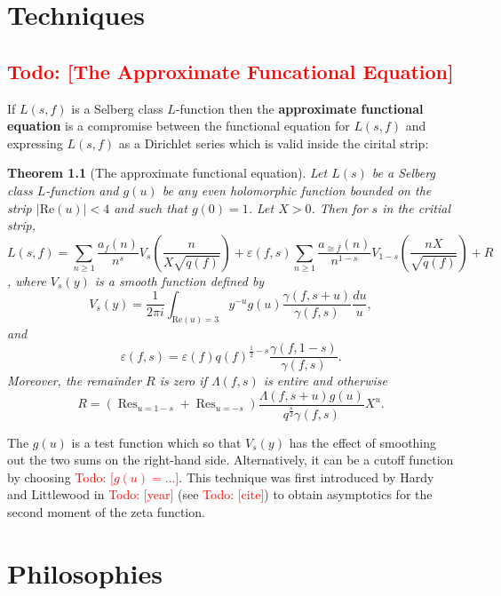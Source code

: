 \documentclass[12pt]{book}
\newtheorem{theorem}{Theorem}[section]
\theoremstyle{definition}\newframedtheorem{method}{Method}
\newcommand{\g}{\gamma}
\renewcommand{\L}{\Lambda}
\newcommand{\e}{\varepsilon}
\newcommand{\<}{\langle}
\renewcommand{\>}{\rangle}
\DeclareMathOperator*{\Res}{\mathrm{Res}}
\renewcommand{\Re}{\mathrm{Re}}
\newcommand{\todo}[1]{\textcolor{red}{\sf Todo: [#1]}}
\begin{document}
\chapter{Techniques}
  \section{\todo{The Approximate Funcational Equation}}
    If $L(s,f)$ is a Selberg class $L$-function then the \textbf{approximate functional equation} is a compromise between the functional equation for $L(s,f)$ and expressing $L(s,f)$ as a Dirichlet series which is valid inside the cirital strip:

    \begin{theorem}[The approximate functional equation]
      Let $L(s)$ be a Selberg class $L$-function and $g(u)$ be any even holomorphic function bounded on the strip $|\Re(u)| < 4$ and such that $g(0) = 1$. Let $X > 0$. Then for $s$ in the critial strip,
      \[
        L(s,f) = \sum_{n \ge 1}\frac{a_{f}(n)}{n^{s}}V_{s}\left(\frac{n}{X\sqrt{q(f)}}\right)+\e(f,s)\sum_{n \ge 1}\frac{a_{\cong{f}}(n)}{n^{1-s}}V_{1-s}\left(\frac{nX}{\sqrt{q(f)}}\right)+R
      \],
      where $V_{s}(y)$ is a smooth function defined by
      \[
        V_{s}(y) = \frac{1}{2\pi i}\int_{\Re(u) = 3}y^{-u}g(u)\frac{\g(f,s+u)}{\g(f,s)}\frac{du}{u},
      \]
      and
      \[
        \e(f,s) = \e(f)q(f)^{\frac{1}{2}-s}\frac{\g(f,1-s)}{\g(f,s)}.
      \]
      Moreover, the remainder $R$ is zero if $\L(f,s)$ is entire and otherwise
      \[
        R = \left(\Res_{u = 1-s}+\Res_{u = -s}\right)\frac{\L(f,s+u)g(u)}{q^{\frac{s}{2}}\g(f,s)}X^{u}.
      \]
    \end{theorem}

    The $g(u)$ is a test function which so that $V_{s}(y)$ has the effect of smoothing out the two sums on the right-hand side. Alternatively, it can be a cutoff function by choosing \todo{$g(u) = ...$}. This technique was first introduced by Hardy and Littlewood in \todo{year} (see \todo{cite}) to obtain asymptotics for the second moment of the zeta function.

\chapter{Philosophies}
\end{document}

